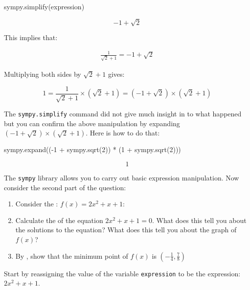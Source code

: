 \begin{pyin}
sympy.simplify(expression)
\end{pyin}

\[ -1 + \sqrt{2}\]

This implies that:

\begin{equation*}
\begin{split}
    \frac{1}{\sqrt{2} + 1} = -1 + \sqrt{2}
\end{split}
\end{equation*}

Multiplying both sides by \({\sqrt{2} + 1}\) gives:

\[
1=\frac{1}{\sqrt{2} + 1}\times \left(\sqrt{2} + 1\right) = \left(-1 + \sqrt{2}\right)\times \left(\sqrt{2} + 1\right)
\]

The \texttt{sympy.simplify} command did not give much insight in to what happened
but you can confirm the above manipulation by expanding \(\left(-1 +
\sqrt{2}\right)\times \left(\sqrt{2} + 1\right)\).
Here is how to do that:

\begin{pyin}
sympy.expand((-1 + sympy.sqrt(2)) * (1 + sympy.sqrt(2)))
\end{pyin}

\[
1
\]

The \texttt{sympy} library allows you to carry out basic expression manipulation.
Now consider the second part of the question:

\begin{enumerate}

\item 

Consider the : \(f(x)=2x ^ 2 + x + 1\):

\item 

Calculate the  of the  equation \(2x ^ 2 + x + 1 =
0\). What does this tell you about the solutions to the equation? What
does this tell you about the graph of \(f(x)\)?

\item 

By , show that the minimum point of \(f(x)\) is
\(\left(-\frac{1}{4}, \frac{7}{8}\right)\)

\end{enumerate}


Start by reassigning the value of the variable \texttt{expression} to be the
expression: \(2x ^ 2 + x + 1\).


